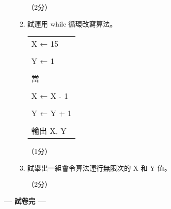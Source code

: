 \documentclass[12pt,a4paper]{article}
\newcommand{\answerline}[1]{\underline{\hspace{#1}}}
\begin{document}
\begin{enumerate}
\begin{enumerate}[label=(\alph*)]
（2分）

\item 試運用 while 循環改寫算法。

\begin{tabular}{|p{13cm}|}
\hline
X ← 15 \\
\\
Y ← 1 \\
\\
當 \answerline{3cm} \\
\\
X ← X - 1 \\
\\
Y ← Y + 1 \\
\\
輸出 X, Y \\
\hline
\end{tabular}

（1分）

\item 試舉出一組會令算法運行無限次的 X 和 Y 值。

\answerline{15cm}

\answerline{15cm} （2分）

\end{enumerate}

\end{enumerate}

\vspace{2em}

\begin{center}
\textbf{--- 試卷完 ---}
\end{center}
\end{document}
